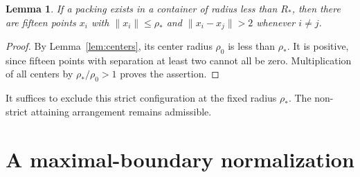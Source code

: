 \documentclass[11pt]{amsart}
\newtheorem{lemma}[theorem]{Lemma}
\theoremstyle{definition}
\theoremstyle{remark}
\numberwithin{equation}{section}
\newcommand{\norm}[1]{\lVert #1\rVert}
\newcommand{\rhoopt}{\rho_*}
\newcommand{\Ropt}{R_*}
\begin{document}
\begin{lemma}\label{lem:strict}
If a packing exists in a container of radius less than $\Ropt$, then there
are fifteen points $x_i$ with $\norm{x_i}\leq\rhoopt$ and
$\norm{x_i-x_j}>2$ whenever $i\ne j$.
\end{lemma}
\begin{proof}
By Lemma~\ref{lem:centers}, its center radius $\rho_0$ is less than
$\rhoopt$. It is positive, since fifteen points with separation at least
two cannot all be zero. Multiplication of all centers by
$\rhoopt/\rho_0>1$ proves the assertion.
\end{proof}

It suffices to exclude this strict configuration at the fixed radius
$\rhoopt$. The non-strict attaining arrangement remains admissible.

\section{A maximal-boundary normalization}
\end{document}
